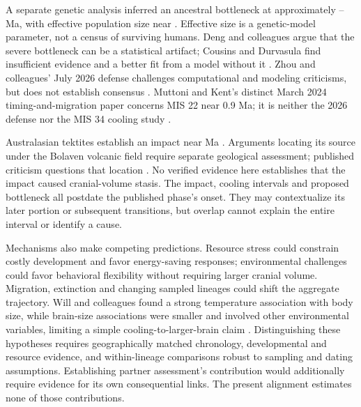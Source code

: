 A separate genetic analysis inferred an ancestral bottleneck at approximately \MwcBottleneckOlder--\MwcBottleneckYounger{} Ma, with effective population size near \MwcEffectiveSize{} \citep{hu2023}. Effective size is a genetic-model parameter, not a census of surviving humans. Deng and colleagues argue that the severe bottleneck can be a statistical artifact; Cousins and Durvasula find insufficient evidence and a better fit from a model without it \citep{deng2025,cousins2025}. Zhou and colleagues' July 2026 defense challenges computational and modeling criticisms, but does not establish consensus \citep{zhou2026}. Muttoni and Kent's distinct March 2024 timing-and-migration paper concerns MIS 22 near 0.9 Ma; it is neither the 2026 defense nor the MIS 34 cooling study \citep{muttoni2024}.

Australasian tektites establish an impact near \MwcImpactAge{} Ma \citep{sieh2023}. Arguments locating its source under the Bolaven volcanic field require separate geological assessment; published criticism questions that location \citep{mizera2022}. No verified evidence here establishes that the impact caused cranial-volume stasis. The impact, cooling intervals and proposed bottleneck all postdate the published phase's onset. They may contextualize its later portion or subsequent transitions, but overlap cannot explain the entire interval or identify a cause.

Mechanisms also make competing predictions. Resource stress could constrain costly development and favor energy-saving responses; environmental challenges could favor behavioral flexibility without requiring larger cranial volume. Migration, extinction and changing sampled lineages could shift the aggregate trajectory. Will and colleagues found a strong temperature association with body size, while brain-size associations were smaller and involved other environmental variables, limiting a simple cooling-to-larger-brain claim \citep{will2021}. Distinguishing these hypotheses requires geographically matched chronology, developmental and resource evidence, and within-lineage comparisons robust to sampling and dating assumptions. Establishing partner assessment's contribution would additionally require evidence for its own consequential links. The present alignment estimates none of those contributions.

